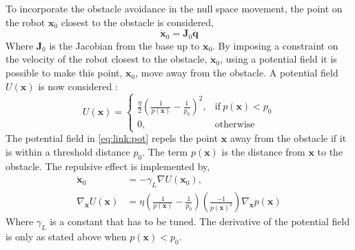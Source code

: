 \documentclass[../main.tex]{subfiles}
\begin{document}
To incorporate the obstacle avoidance in the null space movement, the point on the robot $\boldsymbol{x}_0$ closest to the obstacle is considered,
\begin{equation} \label{eq:link:closest}
    \dot{\boldsymbol{x}}_0 = \boldsymbol{J}_0 \dot{\boldsymbol{q}}
\end{equation}
Where $\boldsymbol{J}_0$ is the Jacobian from the base up to $\boldsymbol{x}_0$. By imposing a constraint on the velocity of the robot closest to the obstacle, $\dot{\boldsymbol{x}}_0$, using a potential field it is possible to make this point, $\boldsymbol{x}_0$, move away from the obstacle. A potential field $U(\boldsymbol{x})$ is now considered \cite{dae-hyung_park_movement_2008}:
\begin{equation} \label{eq:link:pot}
    U(\boldsymbol{x}) = \begin{cases}
      \frac{\eta}{2}\left( \frac{1}{p(\boldsymbol{x})} - \frac{1}{p_0} \right)^2, & \text{if}\ p(\boldsymbol{x}) < p_0 \\
      0, & \text{otherwise}
    \end{cases}
\end{equation}
The potential field in \autoref{eq:link:pot} repels the point $\boldsymbol{x}$ away from the obstacle if it is within a threshold distance $p_0$. The term $p(\boldsymbol{x})$ is the distance from $\boldsymbol{x}$ to the obstacle. The repulsive effect is implemented by,
\begin{align} \label{eq:x0:velocity}
    \dot{\boldsymbol{x}}_0 &= - \gamma_{L} \nabla U(\boldsymbol{x}_0),\\
    \nabla_{\boldsymbol{x}} U(\boldsymbol{x}) &= \eta \left(\frac{1}{p(\boldsymbol{x})}-\frac{1}{p_0} \right)\left( \frac{-1}{p(\boldsymbol{x})^2}\right)\nabla_{\boldsymbol{x}}p(\boldsymbol{x})
\end{align}
Where $\gamma_{L}$ is a constant that has to be tuned. The derivative of the potential field is only as stated above when $p(\boldsymbol{x}) < p_0$.
\end{document}
